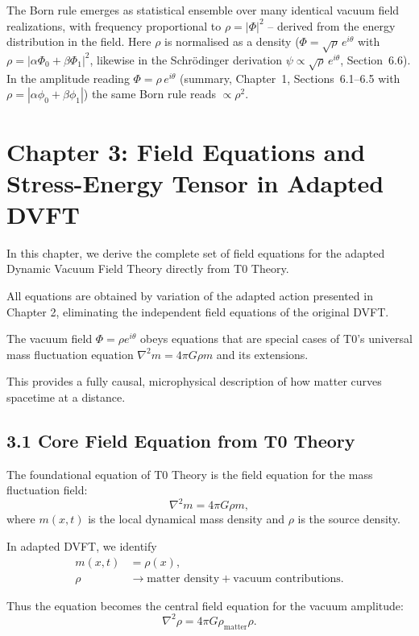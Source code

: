 	The Born rule emerges as statistical ensemble over many identical vacuum field realizations, with frequency proportional to $\rho = |\Phi|^2$ – derived from the energy distribution in the field. Here $\rho$ is normalised as a density ($\Phi = \sqrt{\rho}\,e^{i\theta}$ with $\rho = |\alpha\Phi_0 + \beta\Phi_1|^2$, likewise in the Schrödinger derivation $\psi \propto \sqrt{\rho}\,e^{i\theta}$, Section~6.6). In the amplitude reading $\Phi = \rho\,e^{i\theta}$ (summary, Chapter~1, Sections~6.1--6.5 with $\rho = |\alpha\phi_0 + \beta\phi_1|$) the same Born rule reads $\propto \rho^2$.
	
	\section{Chapter 3: Field Equations and Stress-Energy Tensor in Adapted DVFT}
	
	In this chapter, we derive the complete set of field equations for the adapted Dynamic Vacuum Field Theory directly from T0 Theory.
	
	All equations are obtained by variation of the adapted action presented in Chapter 2, eliminating the independent field equations of the original DVFT.
	
	The vacuum field $\Phi = \rho e^{i\theta}$ obeys equations that are special cases of T0's universal mass fluctuation equation $\nabla^2 m = 4\pi G \rho m$ and its extensions.
	
	This provides a fully causal, microphysical description of how matter curves spacetime at a distance.
	
	\subsection{3.1 Core Field Equation from T0 Theory}
	
	The foundational equation of T0 Theory is the field equation for the mass fluctuation field:
	\[
	\nabla^2 m = 4\pi G \rho m,
	\]
	where $m(x,t)$ is the local dynamical mass density and $\rho$ is the source density.
	
	In adapted DVFT, we identify
	\begin{align}
		m(x,t) &= \rho(x), \\
		\rho &\to \text{matter density} + \text{vacuum contributions}.
	\end{align}
	
	Thus the equation becomes the central field equation for the vacuum amplitude:
	\[
	\nabla^2 \rho = 4\pi G \rho_{\text{matter}} \rho.
	\]
	

